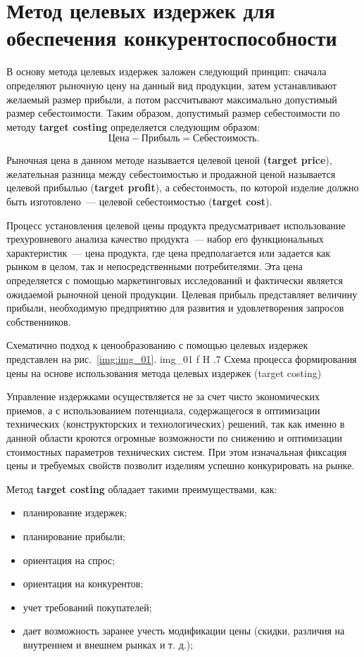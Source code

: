 \chapter{Метод целевых издержек для обеспечения конкурентоспособности}

В основу метода целевых издержек заложен следующий принцип: сначала определяют рыночную цену на данный вид продукции, затем устанавливают желаемый размер прибыли, а потом рассчитывают максимально допустимый размер себестоимости. 
Таким образом, допустимый размер себестоимости по методу \textbf{target costing} определяется следующим образом: 
\begin{equation}
	Цена - Прибыль = Себестоимость.
\end{equation}

Рыночная цена в данном методе называется целевой ценой \textbf{(target price}), желательная разница между себестоимостью и продажной ценой называется целевой прибылью (\textbf{target profit}), а себестоимость, по которой изделие должно быть изготовлено~--- целевой себестоимостью (\textbf{target cost}).

Процесс установления целевой цены продукта предусматривает использование трехуровневого анализа качество продукта~--- набор его функциональных характеристик~--- цена продукта, где цена предполагается или задается как рынком в целом, так и непосредственными потребителями. Эта цена определяется с помощью маркетинговых исследований и фактически является ожидаемой рыночной ценой продукции. 
Целевая прибыль представляет величину прибыли, необходимую предприятию для развития и удовлетворения запросов собственников.   

Схематично подход к ценообразованию с помощью целевых издержек представлен на рис.~\ref{img:img_01}. 
{img_01}
{f}
{H}
{.7\textwidth}
{Схема процесса формирования цены на основе использования  метода целевых издержек (target costing)}

Управление издержками осуществляется не за счет чисто экономических приемов, а с использованием потенциала, содержащегося в оптимизации технических (конструкторских и технологических) решений, так как именно в данной области кроются огромные возможности по снижению и оптимизации стоимостных параметров технических систем. 
При этом изначальная фиксация цены и требуемых свойств позволит изделиям успешно конкурировать на рынке.

Метод \textbf{target costing} обладает такими преимуществами, как:
\begin{itemize}
	\item планирование издержек;
	\item планирование прибыли;
	\item ориентация на спрос;
	\item ориентация на конкурентов;
	\item учет требований покупателей;
	\item дает возможность заранее учесть модификации цены (скидки, различия на внутреннем и внешнем рынках и т. д.); 
\end{itemize}

